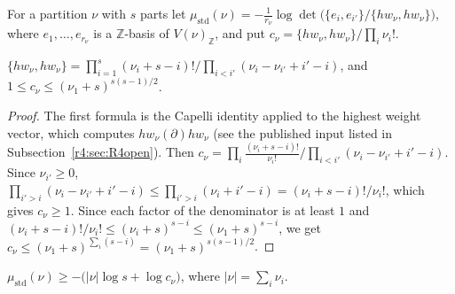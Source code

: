 \begin{definition}\label{r4:R4:std}
For a partition $\nu$ with $s$ parts let $\mu_{\mathrm{std}}(\nu)=-\frac1{r_\nu}\log\det\big(\{e_i,e_{i'}\}/\{hw_\nu,hw_\nu\}\big)$, where $e_1,\dots,e_{r_\nu}$ is a $\mathbb Z$-basis of $V(\nu)_{\mathbb Z}$, and put $c_\nu=\{hw_\nu,hw_\nu\}/\prod_i\nu_i!$.
\end{definition}

\begin{lemma}\label{r4:R4:hook}
$\{hw_\nu,hw_\nu\}=\prod_{i=1}^s(\nu_i+s-i)!\big/\prod_{i<i'}(\nu_i-\nu_{i'}+i'-i)$, and $1\le c_\nu\le(\nu_1+s)^{s(s-1)/2}$.
\end{lemma}

\begin{proof}
The first formula is the Capelli identity applied to the highest weight vector, which computes $hw_\nu(\partial)hw_\nu$ (see the published input listed in Subsection~\ref{r4:sec:R4open}). Then $c_\nu=\prod_i\frac{(\nu_i+s-i)!}{\nu_i!}\big/\prod_{i<i'}(\nu_i-\nu_{i'}+i'-i)$. Since $\nu_{i'}\ge0$, $\prod_{i'>i}(\nu_i-\nu_{i'}+i'-i)\le\prod_{i'>i}(\nu_i+i'-i)=(\nu_i+s-i)!/\nu_i!$, which gives $c_\nu\ge1$. Since each factor of the denominator is at least $1$ and $(\nu_i+s-i)!/\nu_i!\le(\nu_i+s)^{s-i}\le(\nu_1+s)^{s-i}$, we get $c_\nu\le(\nu_1+s)^{\sum_i(s-i)}=(\nu_1+s)^{s(s-1)/2}$.
\end{proof}

\begin{proposition}\label{r4:R4:stdslope}
$\mu_{\mathrm{std}}(\nu)\ge-\big(\lvert\nu\rvert\log s+\log c_\nu\big)$, where $\lvert\nu\rvert=\sum_i\nu_i$.
\end{proposition}

